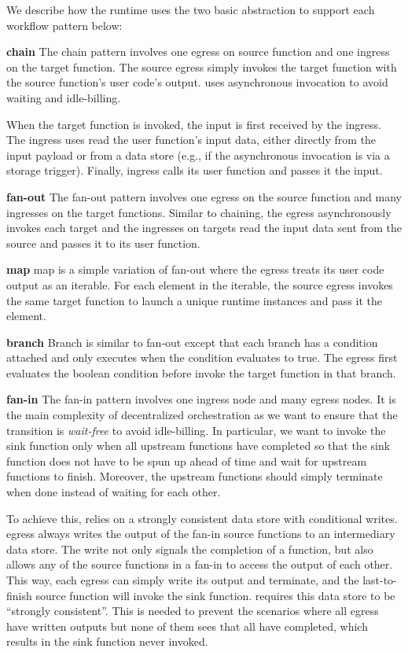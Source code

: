 We describe how the \name{} runtime uses the two basic abstraction to support
each workflow pattern below:

\noindent\textbf{chain} 
The chain pattern involves one egress on source function and one ingress on
the target function. The source egress simply invokes the target function with
the source function's user code's output. \name{} uses asynchronous invocation
to avoid waiting and idle-billing.

When the target function is invoked, the input is first received by the
\name{} ingress. The ingress uses read the user function's input data, either
directly from the input payload or from a data store (e.g., if the
asynchronous invocation is via a storage trigger). Finally, ingress calls its
user function and passes it the input.

\noindent\textbf{fan-out}
The fan-out pattern involves one egress on the source function and many
ingresses on the target functions.
Similar to chaining, the egress asynchronously invokes each target and the
ingresses on targets read the input data sent from the source and passes it to
its user function.

\noindent\textbf{map}
map is a simple variation of fan-out where the egress treats its user code
output as an iterable. For each element in the iterable, the source egress
invokes the same target function to launch a unique runtime instances and pass
it the element.

\noindent\textbf{branch}
Branch is similar to fan-out except that each branch has a condition attached
and only executes when the condition evaluates to true. The egress first
evaluates the boolean condition before invoke the target function in that
branch. 

\textbf{fan-in}
The fan-in pattern involves one ingress node and many egress nodes.
It is the main complexity of decentralized orchestration as we want to ensure
that the transition is \emph{wait-free} to avoid idle-billing. In particular,
we want to invoke the sink function only when all upstream functions have
completed so that the sink function does not have to be spun up ahead of time and
wait for upstream functions to finish. Moreover, the upstream functions should
simply terminate when done instead of waiting for each other.

To achieve this, \name{} relies on a strongly consistent data store with
conditional writes. \name{} egress always writes the output of the fan-in
source functions to an intermediary data store. The write not only signals the
completion of a function, but also allows any of the source functions in a
fan-in to access the output of each other. This way, each egress can simply
write its output and terminate, and the last-to-finish source function will
invoke the sink function.
\name{} requires this data store to be ``strongly consistent''. This is needed
to prevent the scenarios where all egress have written outputs but none of
them sees that all have completed, which results in the sink function never
invoked.


